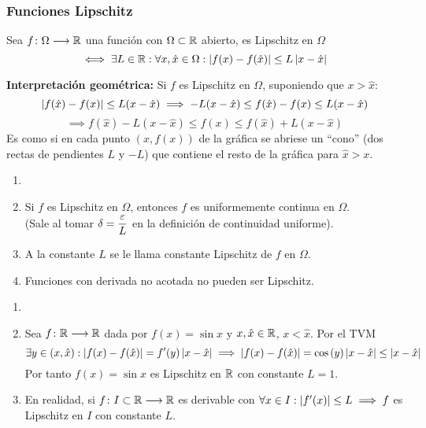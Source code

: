 \subsubsection{Funciones Lipschitz}
\begin{defn}
	Sea $f \colon \Omega \longrightarrow \mathbb{R}$ una función con $\Omega\subset \mathbb{R}$ abierto, es Lipschitz en $\Omega$
	\[\iff\exists L \in \mathbb{R} : \forall x, \hat{x} \in \Omega : \left|f(x)-f(\hat{x})\right|\leq L\left|x-\hat{x}\right|\]
\end{defn}
\textbf{Interpretación geométrica: }Si $f$ es Lipschitz en $\Omega$, suponiendo que $x > \hat{x}$:
\[\left|f(\hat{x})-f(x)\right|\leq L(x-\hat{x}) \implies - L(x-\hat{x}) \leq f(\hat{x})-f(x) \leq L(x-\hat{x}) \]
\[\implies f(\hat{x})-L(x-\hat{x}) \leq f(x) \leq f(\hat{x})+L(x-\hat{x})\] %
Es como si en cada punto $(x, f(x))$ de la gráfica se abriese un ``cono'' (dos rectas de pendientes $L$ y $-L$) que contiene el resto de la gráfica para $\hat{x} > x$.
\begin{obs}
	\begin{enumerate}
		\item[]
		\item Si $f$ es Lipschitz en $\Omega$, entonces $f$ es uniformemente continua en $\Omega$. \\
		      \hspace*{\fill}(Sale al tomar $\displaystyle \delta = \frac{\varepsilon}{L}$ en la definición de continuidad uniforme).
		\item A la constante $L$ se le llama constante Lipschitz de $f$ en $\Omega$.
		\item Funciones con derivada no acotada no pueden ser Lipschitz.
	\end{enumerate}
\end{obs}
\begin{ejem}
	\begin{enumerate}
		\item[]
		\item Sea $f \colon \mathbb{R} \longrightarrow \mathbb{R}$ dada por $f(x)=\sin{x}$ y $x, \hat{x} \in \mathbb{R}$, $x<\hat{x}$. Por el TVM
		      \[\exists y \in (x, \hat{x}) : \left|f(x) - f(\hat{x})\right| = f'(y) \left|x-\hat{x}\right| \implies \left|f(x) - f(\hat{x})\right| = \cos{(y)} \left|x-\hat{x}\right| \leq \left|x-\hat{x}\right|\]
		      Por tanto $f(x)=\sin{x}$ es Lipschitz en $\mathbb{R}$ con constante $L=1$.
		\item En realidad, si $f \colon I\subset\mathbb{R} \longrightarrow \mathbb{R}$ es derivable con $\forall x \in I : \left|f'(x)\right| \leq L \implies f$ es Lipschitz en $I$ con constante $L$.
	\end{enumerate}
\end{ejem}

